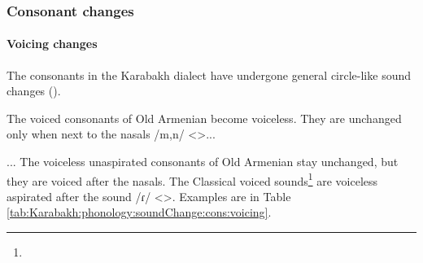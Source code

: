 \subsubsection{Consonant changes}

\paragraph{Voicing changes}\label{section:karabakh:phono:change:cons}

The consonants in the Karabakh dialect have undergone general circle-like sound changes (). 

The voiced consonants of Old Armenian become voiceless. They are unchanged only when next to the nasals /m,n/ <>... 

\begin{adjarianpage}\label{page:65}\end{adjarianpage}%


... The voiceless unaspirated consonants of Old Armenian stay unchanged, but they are voiced after the nasals. The Classical voiced sounds\footnote{} are voiceless aspirated after the sound /ɾ/ <>. Examples are in Table \ref{tab:Karabakh:phonology:soundChange:cons:voicing}. 


